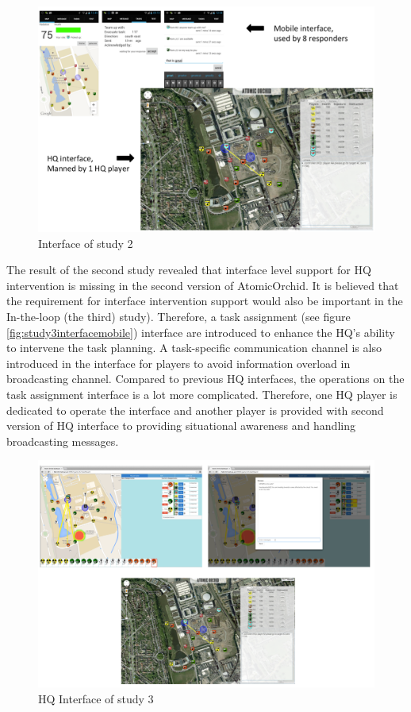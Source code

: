 \begin{figure}[H]
  \centering
  \includegraphics[width=1\textwidth]{img/conclusion/study2interface}
  \caption{Interface of study 2}
  \label{fig:study2interface}
\end{figure}

The result of the second study revealed that interface level support for HQ intervention is missing in the second version of AtomicOrchid. It is believed that the requirement for interface intervention support would also be important in the In-the-loop (the third) study). Therefore, a task assignment (see figure \ref{fig:study3interfacemobile}) interface are introduced to enhance the HQ's ability to intervene the task planning. A task-specific communication channel is also introduced in the interface for players to avoid information overload in broadcasting channel. Compared to previous HQ interfaces, the operations on the task assignment interface is a lot more complicated. Therefore, one HQ player is dedicated to operate the interface and another player is provided with second version of HQ interface to providing situational awareness and handling broadcasting messages. 

\begin{figure}[H]
  \centering
  \includegraphics[width=1\textwidth]{img/conclusion/study3interfaceHQ}
  \caption{HQ Interface of study 3}
  \label{fig:study3interfacehq}
\end{figure}

